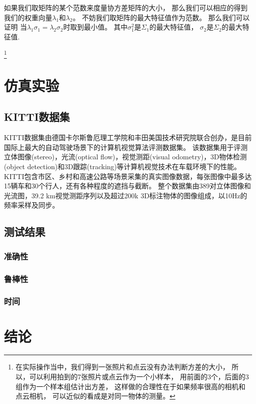 \documentclass{amsart}
\begin{document}
如果我们取矩阵的某个范数来度量协方差矩阵的大小，
那么我们可以相应的得到我们的权重向量$\lambda_1$和$\lambda_2$。
不妨我们取矩阵的最大特征值作为范数。
那么我们可以证明
当$\lambda_1\sigma_1=\lambda_2\sigma_2$时取到最小值。
其中$\sigma_1^2$是$\Sigma_1$的最大特征值，
$\sigma_2$是$\Sigma_2$的最大特征值.

\footnote{在实际操作当中，我们得到一张照片和点云没有办法判断方差的大小，
  所以，可以利用拍到的7张照片或点云作为一个小样本，
  用前面的3个，后面的3组作为一个样本组估计出方差，
  这样做的合理性在于如果频率很高的相机和点云相机，
  可以近似的看成是对同一物体的测量。
}
\section{仿真实验}
\subsection{KITTI数据集}
KITTI数据集由德国卡尔斯鲁厄理工学院和丰田美国技术研究院联合创办，是目前国际上最大的自动驾驶场景下的计算机视觉算法评测数据集。
该数据集用于评测立体图像(stereo)，光流(optical flow)，视觉测距(visual odometry)，3D物体检测(object detection)和3D跟踪(tracking)等计算机视觉技术在车载环境下的性能。
KITTI包含市区、乡村和高速公路等场景采集的真实图像数据，每张图像中最多达15辆车和30个行人，还有各种程度的遮挡与截断。
整个数据集由389对立体图像和光流图，39.2 km视觉测距序列以及超过200k 3D标注物体的图像组成，以10Hz的频率采样及同步。

\subsection{测试结果}
\subsubsection{准确性}
\label{sec:0601}
\subsubsection{鲁棒性}
\subsubsection{时间}
\section{结论}
\end{document}
